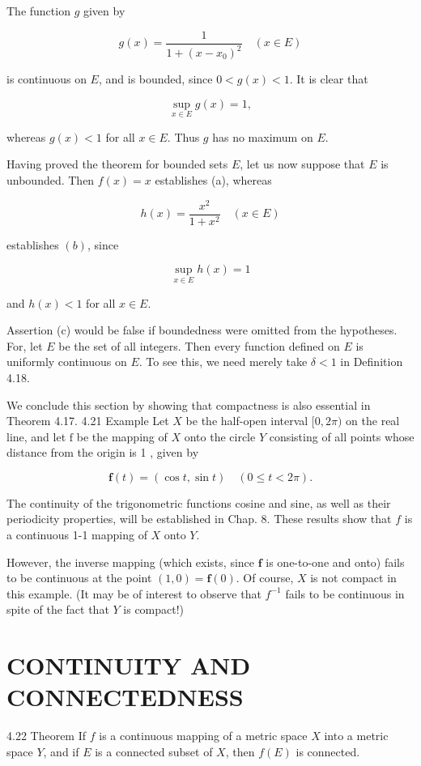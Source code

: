 \documentclass[10pt]{article}
\begin{document}
The function $g$ given by

$$
g(x)=\frac{1}{1+\left(x-x_{0}\right)^{2}} \quad(x \in E)
$$

is continuous on $E$, and is bounded, since $0<g(x)<1$. It is clear that

$$
\sup _{x \in E} g(x)=1,
$$

whereas $g(x)<1$ for all $x \in E$. Thus $g$ has no maximum on $E$.

Having proved the theorem for bounded sets $E$, let us now suppose that $E$ is unbounded. Then $f(x)=x$ establishes (a), whereas

$$
h(x)=\frac{x^{2}}{1+x^{2}} \quad(x \in E)
$$

establishes $(b)$, since

$$
\sup _{x \in E} h(x)=1
$$

and $h(x)<1$ for all $x \in E$.

Assertion (c) would be false if boundedness were omitted from the hypotheses. For, let $E$ be the set of all integers. Then every function defined on $E$ is uniformly continuous on $E$. To see this, we need merely take $\delta<1$ in Definition 4.18.

We conclude this section by showing that compactness is also essential in Theorem 4.17. 4.21 Example Let $X$ be the half-open interval $[0,2 \pi)$ on the real line, and let $\mathrm{f}$ be the mapping of $X$ onto the circle $Y$ consisting of all points whose distance from the origin is 1 , given by

$$
\mathbf{f}(t)=(\cos t, \sin t) \quad(0 \leq t<2 \pi) .
$$

The continuity of the trigonometric functions cosine and sine, as well as their periodicity properties, will be established in Chap. 8. These results show that $f$ is a continuous 1-1 mapping of $X$ onto $Y$.

However, the inverse mapping (which exists, since $\mathbf{f}$ is one-to-one and onto) fails to be continuous at the point $(1,0)=\mathbf{f}(0)$. Of course, $X$ is not compact in this example. (It may be of interest to observe that $f^{-1}$ fails to be continuous in spite of the fact that $Y$ is compact!)

\section{CONTINUITY AND CONNECTEDNESS}
4.22 Theorem If $f$ is a continuous mapping of a metric space $X$ into a metric space $Y$, and if $E$ is a connected subset of $X$, then $f(E)$ is connected.
\end{document}
